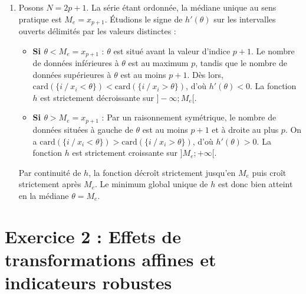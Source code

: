 \documentclass[11pt,a4paper]{article}
\begin{document}
\begin{enumerate}
\begin{enumerate}
        \item Posons $N = 2p+1$. La série étant ordonnée, la médiane unique au sens pratique est $M_e = x_{p+1}$. Étudions le signe de $h'(\theta)$ sur les intervalles ouverts délimités par les valeurs distinctes :
        \begin{itemize}
            \item \textbf{Si $\theta < M_e = x_{p+1}$} : $\theta$ est situé avant la valeur d'indice $p+1$. Le nombre de données inférieures à $\theta$ est au maximum $p$, tandis que le nombre de données supérieures à $\theta$ est au moins $p+1$. Dès lors, $\text{card}(\{i \ / \ x_i < \theta\}) < \text{card}(\{i \ / \ x_i > \theta\})$, d'où $h'(\theta) < 0$. La fonction $h$ est strictement décroissante sur $]-\infty ; M_e[$.
            \item \textbf{Si $\theta > M_e = x_{p+1}$} : Par un raisonnement symétrique, le nombre de données situées à gauche de $\theta$ est au moins $p+1$ et à droite au plus $p$. On a $\text{card}(\{i \ / \ x_i < \theta\}) > \text{card}(\{i \ / \ x_i > \theta\})$, d'où $h'(\theta) > 0$. La fonction $h$ est strictement croissante sur $]M_e ; +\infty[$.
        \end{itemize}
        Par continuité de $h$, la fonction décroît strictement jusqu'en $M_e$ puis croît strictement après $M_e$. Le minimum global unique de $h$ est donc bien atteint en la médiane $\theta = M_e$.
    \end{enumerate}
\end{enumerate}

\newpage

\section*{Exercice 2 : Effets de transformations affines et indicateurs robustes}
\end{document}
